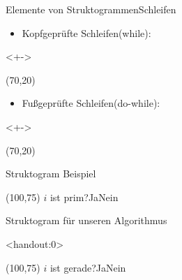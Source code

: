 \begin{frame}{Elemente von Struktogrammen}{Schleifen}
\begin{itemize}
    \item <+->Kopfgeprüfte Schleifen(while):
\end{itemize}
\begin{onlyenv}<+->
\begin{centernss}
\begin{struktogramm}(70,20)
    \whileend
\end{struktogramm}
\end{centernss}
\end{onlyenv}

\begin{itemize}
    \item <+->Fußgeprüfte Schleifen(do-while):
\end{itemize}
\begin{onlyenv}<+->
\begin{centernss}
\begin{struktogramm}(70,20)
    \untilend
\end{struktogramm}
\end{centernss}
\end{onlyenv}
\end{frame}

\begin{frame}{Struktogram Beispiel}
\begin{centernss}
\begin{struktogramm}(100,75)
            {\( i \) ist prim?}{Ja}{Nein}
            \change
        \ifend
    \untilend
\end{struktogramm}
\end{centernss}
\end{frame}

\begin{frame}{Struktogram für unseren Algorithmus}
\begin{centernss}
\begin{onlyenv}<handout:0>
\begin{struktogramm}(100,75)
            {\( i \) ist gerade?}{Ja}{Nein}
            \change
        \ifend
    \whileend
\end{struktogramm}
\end{onlyenv}
\end{centernss}
\end{frame}

